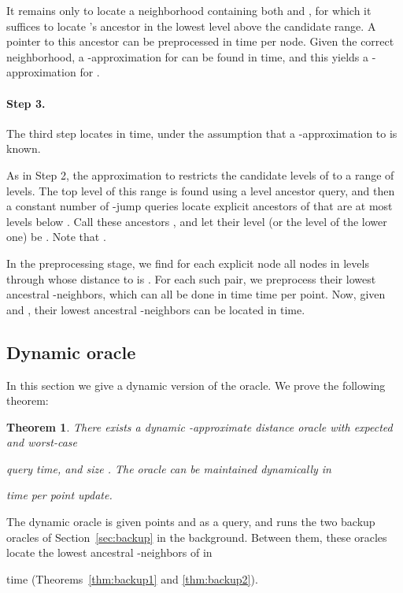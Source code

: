 \documentclass[11pt]{article}
\newtheorem{theorem}{Theorem}
\begin{document}
It remains only to locate a neighborhood containing both  and , for which it
suffices to locate 's ancestor in the lowest level  above the
candidate range. A pointer to this ancestor can be preprocessed in time  per
node. Given the correct neighborhood, a -approximation for  can be
found in  time, and this yields a -approximation for 
.


\paragraph{Step 3.}
The third step locates  in  time,
under the assumption that a -approximation to  is known.

As in Step 2, the  approximation to  restricts the candidate
levels of  to a range of  levels. The top level of this range 
is found using a level ancestor query, and then a constant number of -jump
queries locate explicit ancestors of  that are at most  levels below
. Call these ancestors , and let their level (or the level of the lower one)
be . Note that 
.

In the preprocessing stage, we find for each explicit node  all nodes in 
levels  through  whose distance to  is . 
For each such pair, we preprocess their lowest ancestral -neighbors, which can all be 
done in time  time per point. Now, given  and , 
their lowest ancestral -neighbors can be located in  time.



\subsection{Dynamic oracle}\label{sec:main-dynamic}

In this section we give a dynamic version of the oracle. We prove the following theorem:
\begin{theorem}\label{thm:dynamic-oracle}
There exists a dynamic -approximate distance oracle with expected  and
worst-case

query time, and size
.
The oracle can be maintained dynamically in 

time per point update.
\end{theorem}

The dynamic oracle is given points  and  as a query, and runs the two backup oracles of
Section~\ref{sec:backup} in the background. Between them, these oracles locate the
lowest ancestral -neighbors of  in

time (Theorems~\ref{thm:backup1} and \ref{thm:backup2}).
\end{document}
